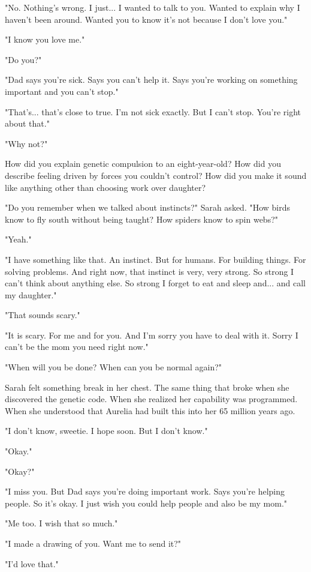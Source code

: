 "No. Nothing's wrong. I just... I wanted to talk to you. Wanted to explain why I haven't been around. Wanted you to know it's not because I don't love you."

"I know you love me."

"Do you?"

"Dad says you're sick. Says you can't help it. Says you're working on something important and you can't stop."

"That's... that's close to true. I'm not sick exactly. But I can't stop. You're right about that."

"Why not?"

How did you explain genetic compulsion to an eight-year-old? How did you describe feeling driven by forces you couldn't control? How did you make it sound like anything other than choosing work over daughter?

"Do you remember when we talked about instincts?" Sarah asked. "How birds know to fly south without being taught? How spiders know to spin webs?"

"Yeah."

"I have something like that. An instinct. But for humans. For building things. For solving problems. And right now, that instinct is very, very strong. So strong I can't think about anything else. So strong I forget to eat and sleep and... and call my daughter."

"That sounds scary."

"It is scary. For me and for you. And I'm sorry you have to deal with it. Sorry I can't be the mom you need right now."

"When will you be done? When can you be normal again?"

Sarah felt something break in her chest. The same thing that broke when she discovered the genetic code. When she realized her capability was programmed. When she understood that Aurelia had built this into her 65 million years ago.

"I don't know, sweetie. I hope soon. But I don't know."

"Okay."

"Okay?"

"I miss you. But Dad says you're doing important work. Says you're helping people. So it's okay. I just wish you could help people and also be my mom."

"Me too. I wish that so much."

"I made a drawing of you. Want me to send it?"

"I'd love that."


